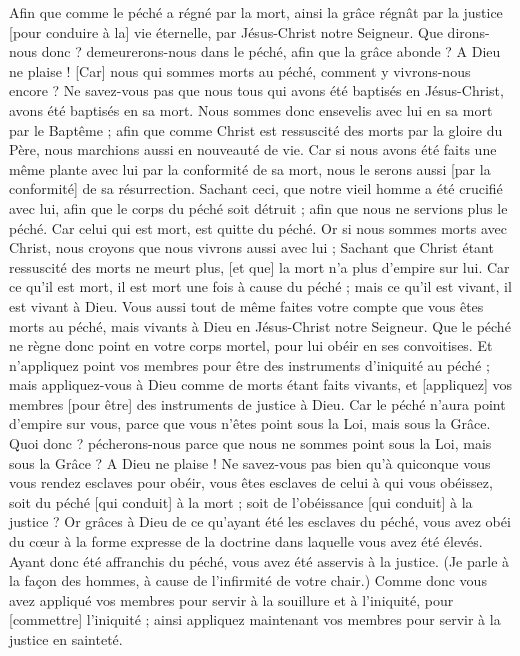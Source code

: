 \begin{multicols}{2}
Afin que comme le péché a régné par la mort, ainsi la grâce régnât par la justice [pour conduire à la] vie éternelle, par Jésus-Christ notre Seigneur.
\VerseOne{}Que dirons-nous donc ? demeurerons-nous dans le péché, afin que la grâce abonde ?
A Dieu ne plaise ! [Car] nous qui sommes morts au péché, comment y vivrons-nous encore ?
Ne savez-vous pas que nous tous qui avons été baptisés en Jésus-Christ, avons été baptisés en sa mort.
Nous sommes donc ensevelis avec lui en sa mort par le Baptême ; afin que comme Christ est ressuscité des morts par la gloire du Père, nous marchions aussi en nouveauté de vie.
Car si nous avons été faits une même plante avec lui par la conformité de sa mort, nous le serons aussi [par la conformité] de sa résurrection.
Sachant ceci, que notre vieil homme a été crucifié avec lui, afin que le corps du péché soit détruit ; afin que nous ne servions plus le péché.
Car celui qui est mort, est quitte du péché.
Or si nous sommes morts avec Christ, nous croyons que nous vivrons aussi avec lui ;
Sachant que Christ étant ressuscité des morts ne meurt plus, [et que] la mort n'a plus d'empire sur lui.
Car ce qu'il est mort, il est mort une fois à cause du péché ; mais ce qu'il est vivant, il est vivant à Dieu.
Vous aussi tout de même faites votre compte que vous êtes morts au péché, mais vivants à Dieu en Jésus-Christ notre Seigneur.
Que le péché ne règne donc point en votre corps mortel, pour lui obéir en ses convoitises.
Et n'appliquez point vos membres pour être des instruments d'iniquité au péché ; mais appliquez-vous à Dieu comme de morts étant faits vivants, et [appliquez] vos membres [pour être] des instruments de justice à Dieu.
Car le péché n'aura point d'empire sur vous, parce que vous n'êtes point sous la Loi, mais sous la Grâce.
Quoi donc ? pécherons-nous parce que nous ne sommes point sous la Loi, mais sous la Grâce ? A Dieu ne plaise !
Ne savez-vous pas bien qu'à quiconque vous vous rendez esclaves pour obéir, vous êtes esclaves de celui à qui vous obéissez, soit du péché [qui conduit] à la mort ; soit de l'obéissance [qui conduit] à la justice ?
Or grâces à Dieu de ce qu'ayant été les esclaves du péché, vous avez obéi du cœur à la forme expresse de la doctrine dans laquelle vous avez été élevés.
Ayant donc été affranchis du péché, vous avez été asservis à la justice.
(Je parle à la façon des hommes, à cause de l'infirmité de votre chair.) Comme donc vous avez appliqué vos membres pour servir à la souillure et à l'iniquité, pour [commettre] l'iniquité ; ainsi appliquez maintenant vos membres pour servir à la justice en sainteté.

\end{multicols}
